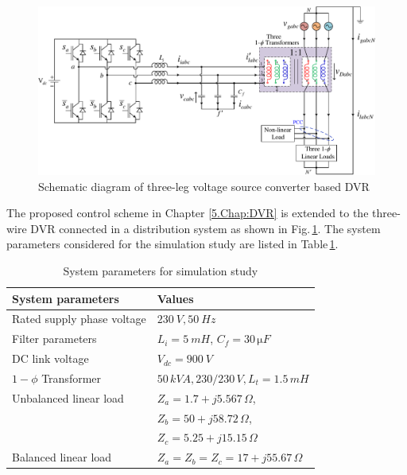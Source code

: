 \begin{figure}[]\centering
	\includegraphics[scale=0.72	]{figures/Appendix/3leg_DVR.pdf}
	\caption{Schematic diagram of three-leg voltage source converter based DVR} %
	\label{B1.fig1}
\end{figure} 


The proposed control scheme in Chapter \ref{5.Chap:DVR} is extended to the three-wire DVR connected in a distribution system as shown in Fig.\,\ref{B1.fig1}. The system parameters considered for the simulation study are listed in Table\,\ref{TableB1.2}.
\begin{table}[] 
	\centering
	\caption{System parameters for simulation study}
	\label{TableB1.2}
	\begin{tabular}{>{\small}l>{\small}l}  
		\hline
		\hline
		\textbf{\footnotesize System parameters} & \textbf{\footnotesize Values}\\
		\hline
		\footnotesize Rated supply phase voltage & \footnotesize$230 ~\si{V}, 50 ~\si{Hz}$ \\
		\footnotesize Filter parameters & \footnotesize $L_{i} = 5 ~\si{mH}$, $C_{f} = 30 \, \si{\micro F	}$ \\ 
		\footnotesize DC link voltage & \footnotesize $V_{dc} = 900 ~\si{V}$ \\
		\footnotesize $1-\phi$ Transformer & \footnotesize $50 \, \si{kVA}, 230/230 \, \si{V}, L_{t} = 1.5 \, \si{mH	}$ \\
		\footnotesize Unbalanced linear load  &  \footnotesize $Z_{a} = 1.7+j5.567\,\si{\Omega}$, \\ & \footnotesize $Z_{b} = 50+j58.72\, \si{\Omega}$, \\  & \footnotesize $Z_{c} = 5.25+j15.15\, \si{\Omega}$ \\
		\footnotesize Balanced linear load  &  \footnotesize $Z_{a} = Z_{b} = Z_{c} = 17+j55.67\,\si{\Omega}$ \\ 
		\hline
		\hline 
	\end{tabular} %
\end{table} 

